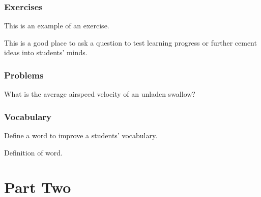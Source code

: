 \documentclass[11pt,fleqn]{book} %
\begin{document}
\begin{example}
\lipsum[2]
\end{example}


\section{Exercises}

This is an example of an exercise.

\begin{exercise}
This is a good place to ask a question to test learning progress or further cement ideas into students' minds.
\end{exercise}


\section{Problems}

\begin{problem}
What is the average airspeed velocity of an unladen swallow?
\end{problem}


\section{Vocabulary}

Define a word to improve a students' vocabulary.

\begin{vocabulary}[Word]
Definition of word.
\end{vocabulary}


\part{Part Two}

\end{document}
